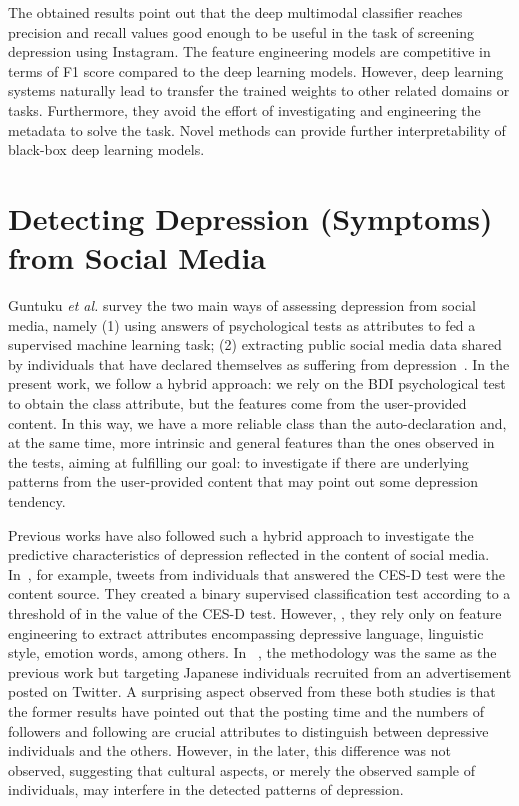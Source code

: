 \documentclass[letterpaper]{article} \usepackage{aaai20}  \usepackage{times}  \usepackage{helvet} \usepackage{courier}  \usepackage[hyphens]{url}  \usepackage{graphicx} \urlstyle{rm} \def\UrlFont{\rm}  \usepackage{graphicx}  \frenchspacing  \setlength{\pdfpagewidth}{8.5in}  \setlength{\pdfpageheight}{11in}  \usepackage[final]{changes}
\begin{document}
The obtained results point out that the deep multimodal classifier reaches precision and recall values good enough to be useful in the task of screening depression using Instagram. The feature engineering models are competitive in terms of F1 score compared to the deep learning models. However, deep learning systems naturally lead to transfer the trained weights to other related domains or tasks. Furthermore, they avoid the effort of investigating and engineering the metadata to solve the task.  Novel methods can provide further interpretability of black-box deep learning models.


\section{Detecting Depression (Symptoms) from Social Media}\label{sec:2}
Guntuku \textit{et al.} survey the two main ways of assessing depression from social media, namely (1) using answers of psychological tests as attributes to fed a supervised machine learning task; (2) extracting public social media data shared by individuals that have declared themselves as suffering from depression~\cite{guntuku2017detecting}. 
In the present work, we follow a hybrid approach: we rely on the BDI psychological test to obtain the class attribute, but the features come from the user-provided content. In this way, we have a more reliable class than the auto-declaration and, at the same time, more intrinsic and general features than the ones observed in the tests, aiming at fulfilling our goal: to investigate if there are underlying patterns from the user-provided content that may point out some depression tendency. 

Previous works have also followed such a hybrid approach to investigate the predictive characteristics of depression reflected in the content of social media. In~\cite{de2013predicting}, for example, tweets from individuals that answered the CES-D test were the content source. They created a binary supervised classification test according to a threshold of  in the value of the CES-D test. However, , they rely only on feature engineering to extract attributes encompassing depressive language, linguistic style, emotion words, among others. In ~\cite{tsugawa2015recognizing}, the methodology was the same as the previous work but targeting Japanese individuals recruited from an advertisement posted on Twitter. A surprising aspect observed from these both studies is that the former results have pointed out that the posting time and the numbers of followers and following are crucial attributes to distinguish between depressive individuals and the others. However, in the later, this difference was not observed, suggesting that cultural aspects, or merely the observed sample of individuals, may interfere in the detected patterns of depression. 
\end{document}
